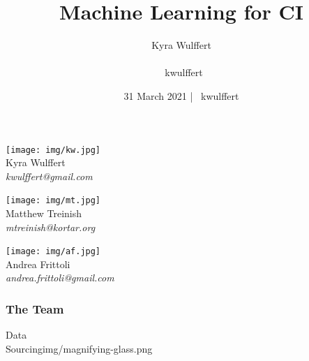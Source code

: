 \documentclass[aspectratio=169,11pt,hyperref={colorlinks=true}]{beamer}
\author[Kyra]{%
\LARGE Kyra Wulffert \\
\tiny~ \\
\normalsize \faGithub ~kwulffert \\
}
\date[31 March 2021]{31 March 2021 | \faGithub ~kwulffert}
\title{Machine Learning for CI}
\institute[Women in Data Science Bristol]{%
31 March 2021
}
\begin{document}
\begin{frame}[noframenumbering]
\titlepage{}
\end{frame}

\begin{3columnsframe}
  {
  \begin{centering}
    \texttt{[image: img/kw.jpg]} \\
    Kyra Wulffert \\
    \em{kwulffert@gmail.com} \\
  \end{centering}
  }
  {
  \begin{centering}
    \texttt{[image: img/mt.jpg]} \\
    Matthew Treinish \\
    \em{mtreinish@kortar.org} \\
  \end{centering}
  }
  {
  \begin{centering}
    \texttt{[image: img/af.jpg]} \\
    Andrea Frittoli \\
    \em{andrea.frittoli@gmail.com} \\
  \end{centering}
  }
  \frametitle{The Team}
\end{3columnsframe}

\begin{sectionpic}
{Data \\Sourcing}{img/magnifying-glass.png}
\end{sectionpic}
\end{document}
